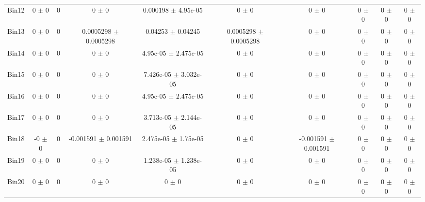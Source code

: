\begin{tabular}{@{\extracolsep{4pt}}lccccccccc@{}}
     Bin12 & 0 $\pm$ 0 & 0 & 0 $\pm$ 0 & 0.000198 $\pm$ 4.95e-05 & 0 $\pm$ 0 & 0 $\pm$ 0 & 0 $\pm$ 0 & 0 $\pm$ 0 & 0 $\pm$ 0 \\ 
     Bin13 & 0 $\pm$ 0 & 0 & 0.0005298 $\pm$ 0.0005298 & 0.04253 $\pm$ 0.04245 & 0.0005298 $\pm$ 0.0005298 & 0 $\pm$ 0 & 0 $\pm$ 0 & 0 $\pm$ 0 & 0 $\pm$ 0 \\ 
     Bin14 & 0 $\pm$ 0 & 0 & 0 $\pm$ 0 & 4.95e-05 $\pm$ 2.475e-05 & 0 $\pm$ 0 & 0 $\pm$ 0 & 0 $\pm$ 0 & 0 $\pm$ 0 & 0 $\pm$ 0 \\ 
     Bin15 & 0 $\pm$ 0 & 0 & 0 $\pm$ 0 & 7.426e-05 $\pm$ 3.032e-05 & 0 $\pm$ 0 & 0 $\pm$ 0 & 0 $\pm$ 0 & 0 $\pm$ 0 & 0 $\pm$ 0 \\ 
     Bin16 & 0 $\pm$ 0 & 0 & 0 $\pm$ 0 & 4.95e-05 $\pm$ 2.475e-05 & 0 $\pm$ 0 & 0 $\pm$ 0 & 0 $\pm$ 0 & 0 $\pm$ 0 & 0 $\pm$ 0 \\ 
     Bin17 & 0 $\pm$ 0 & 0 & 0 $\pm$ 0 & 3.713e-05 $\pm$ 2.144e-05 & 0 $\pm$ 0 & 0 $\pm$ 0 & 0 $\pm$ 0 & 0 $\pm$ 0 & 0 $\pm$ 0 \\ 
     Bin18 & -0 $\pm$ 0 & 0 & -0.001591 $\pm$ 0.001591 & 2.475e-05 $\pm$ 1.75e-05 & 0 $\pm$ 0 & -0.001591 $\pm$ 0.001591 & 0 $\pm$ 0 & 0 $\pm$ 0 & 0 $\pm$ 0 \\ 
     Bin19 & 0 $\pm$ 0 & 0 & 0 $\pm$ 0 & 1.238e-05 $\pm$ 1.238e-05 & 0 $\pm$ 0 & 0 $\pm$ 0 & 0 $\pm$ 0 & 0 $\pm$ 0 & 0 $\pm$ 0 \\ 
     Bin20 & 0 $\pm$ 0 & 0 & 0 $\pm$ 0 & 0 $\pm$ 0 & 0 $\pm$ 0 & 0 $\pm$ 0 & 0 $\pm$ 0 & 0 $\pm$ 0 & 0 $\pm$ 0 \\ 
\hline\hline
  \end{tabular}
